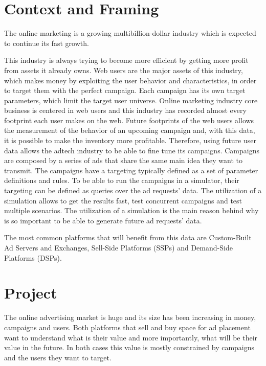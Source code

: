 \documentclass[9pt,a4paper]{extarticle}
\begin{document}
\begin{multicols}{2}

\section{Context and Framing} \label{sec:context}

The online marketing is a growing multibillion-dollar industry \cite{PricewaterhouseCoopers2013}
which is expected to continue its fast growth\cite{PricewaterhouseCoopers2013a}.

This industry is always trying to become more efficient by getting more profit from
assets it already owns. 
Web users are the major assets of this industry, which makes money by exploiting the user behavior and characteristics, in order to target them with the
perfect campaign. Each campaign has its own target parameters, which limit the target user universe.
Online marketing industry core business is centered in web users and this industry has recorded almost every footprint each user makes on the web.
Future footprints of the web users allows the measurement of the behavior of an
upcoming campaign and, with this data, it is possible to make the inventory more
profitable. Therefore, using future user data allows the adtech industry to be able to fine tune its campaigns. 
Campaigns are composed by a series of ads that share the same main idea they
want to transmit. The campaigns have a targeting typically defined as a set of
parameter definitions and rules. To be able to run the campaigns in a
simulator, their targeting can be defined as
queries over the ad requests' data. The utilization of a simulation allows to
get the results fast, test concurrent campaigns and test multiple scenarios.
The utilization of a simulation is the main reason behind
why is so important to be able to generate future ad requests' data.

The most common platforms that will benefit from this data are Custom-Built Ad
Servers and Exchanges, Sell-Side Platforms (SSPs) and
Demand-Side Platforms
(DSPs).


\section{Project} \label{sec:proj}

The online advertising market is huge and its size has been increasing in money,
campaigns and users. Both platforms that sell and buy space for ad placement
want to understand what is their value and more importantly, what will be their
value in the future. In both cases this value is mostly constrained by campaigns
and the users they want to target.


\end{multicols}
\end{document}
